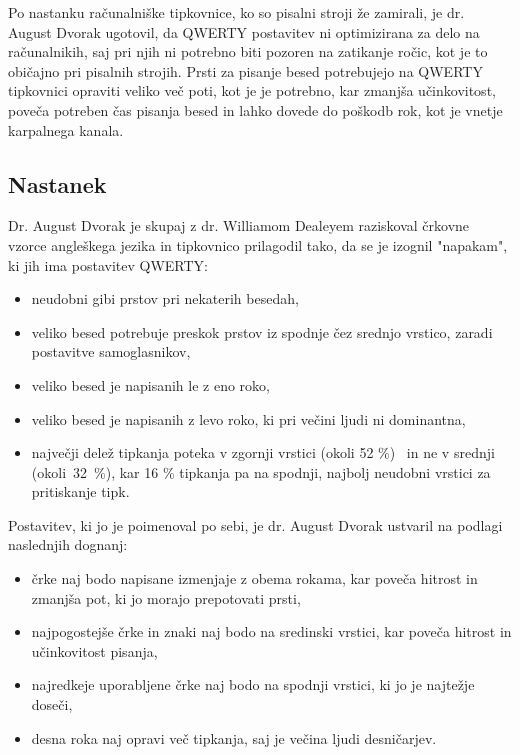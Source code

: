 

    Po nastanku računalniške tipkovnice, ko so pisalni stroji že zamirali, je dr. August Dvorak ugotovil,
    da QWERTY postavitev ni optimizirana za delo na računalnikih, saj pri njih ni potrebno biti pozoren na zatikanje ročic,
    kot je to običajno pri pisalnih strojih.
    Prsti za pisanje besed potrebujejo na QWERTY tipkovnici opraviti veliko več poti, kot je je potrebno,
    kar zmanjša učinkovitost, poveča potreben čas pisanja besed in lahko dovede do poškodb rok,
    kot je vnetje karpalnega kanala.

    \subsection{Nastanek}\label{subsec:nastanek}

    Dr. August Dvorak je skupaj z dr. Williamom Dealeyem raziskoval črkovne vzorce angleškega jezika in tipkovnico prilagodil tako,
    da se je izognil "napakam", ki jih ima postavitev QWERTY:

    \begin{itemize}
        \item neudobni gibi prstov pri nekaterih besedah,
        \item veliko besed potrebuje preskok prstov iz spodnje čez srednjo vrstico, zaradi postavitve samoglasnikov,
        \item veliko besed je napisanih le z eno roko,
        \item veliko besed je napisanih z levo roko, ki pri večini ljudi ni dominantna,
        \item največji delež tipkanja poteka v zgornji vrstici (okoli 52 \%)~\cite{curse} in ne v srednji \mbox{(okoli 32 \%)}, kar 16 \% tipkanja pa na spodnji, najbolj neudobni vrstici za pritiskanje tipk.
    \end{itemize}

    Postavitev, ki jo je poimenoval po sebi, je dr. August Dvorak ustvaril na podlagi naslednjih dognanj:

    \begin{itemize}
        \item črke naj bodo napisane izmenjaje z obema rokama, kar poveča hitrost in zmanjša pot, ki jo morajo prepotovati prsti,
        \item najpogostejše črke in znaki naj bodo na sredinski vrstici, kar poveča hitrost in učinkovitost pisanja,
        \item najredkeje uporabljene črke naj bodo na spodnji vrstici, ki jo je najtežje doseči,
        \item desna roka naj opravi več tipkanja, saj je večina ljudi desničarjev.
    \end{itemize}

